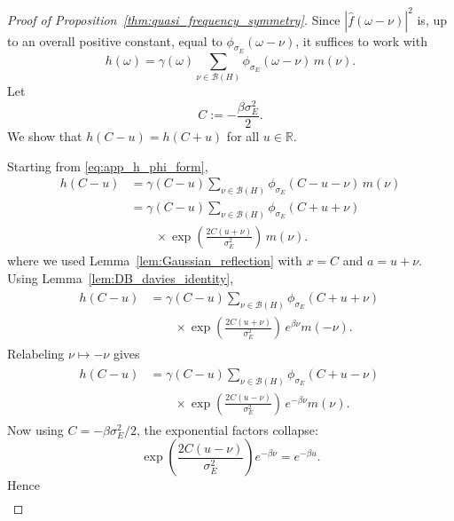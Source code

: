 \documentclass[showpacs,amsmath,amssymb,twocolumn,prx,superscriptaddress,10pt,aps,nofootinbib]{revtex4-2}
\begin{document}
\begin{proof}[Proof of Proposition~\ref{thm:quasi_frequency_symmetry}]
Since \(|\hat f(\omega-\nu)|^2\) is, up to an overall positive constant, equal to \(\phi_{\sigma_E}(\omega-\nu)\), it suffices to work with
\begin{equation}
\label{eq:app_h_phi_form}
    h(\omega)
    =
    \gamma(\omega)\sum_{\nu\in\mathcal B(H)}
    \phi_{\sigma_E}(\omega-\nu)\,m(\nu).
\end{equation}
Let
\begin{equation}
C:=-\frac{\beta\sigma_E^2}{2}.
\end{equation}
We show that $h(C-u)=h(C+u)$ for all $u\in\mathbb R$.

Starting from \eqref{eq:app_h_phi_form},
\begin{align}
    h(C-u)
    &=
    \gamma(C-u)\sum_{\nu\in\mathcal B(H)}
    \phi_{\sigma_E}(C-u-\nu)\,m(\nu)
    \nonumber\\
    &=
    \gamma(C-u)\sum_{\nu\in\mathcal B(H)}
    \phi_{\sigma_E}(C+u+\nu)\,
    \nonumber\\
    &\qquad\times
    \exp\!\left(\frac{2C(u+\nu)}{\sigma_E^2}\right)\,
    m(\nu).
\end{align}
where we used Lemma~\ref{lem:Gaussian_reflection} with $x=C$ and $a=u+\nu$. Using Lemma~\ref{lem:DB_davies_identity},
\begin{align}
\begin{split}
    h(C-u)
    &=
    \gamma(C-u)\sum_{\nu\in\mathcal B(H)}
    \phi_{\sigma_E}(C+u+\nu)\, 
    \\ &\qquad \times
    \exp\!\left(\frac{2C(u+\nu)}{\sigma_E^2}\right)\,
    e^{\beta\nu}m(-\nu).
\end{split}
\end{align}
Relabeling $\nu\mapsto -\nu$ gives
\begin{align}
\begin{split}
    h(C-u)
    &=
    \gamma(C-u)\sum_{\nu\in\mathcal B(H)}
    \phi_{\sigma_E}(C+u-\nu)\,
    \\ &\qquad \times
    \exp\!\left(\frac{2C(u-\nu)}{\sigma_E^2}\right)\,
    e^{-\beta\nu}m(\nu).
\end{split}
\end{align}
Now using $C=-\beta\sigma_E^2/2$, the exponential factors collapse:
\begin{equation}
\exp\!\left(\frac{2C(u-\nu)}{\sigma_E^2}\right)e^{-\beta\nu}
=
e^{-\beta u}.
\end{equation}
Hence
\begin{align}

\end{align}
\end{proof}
\end{document}
